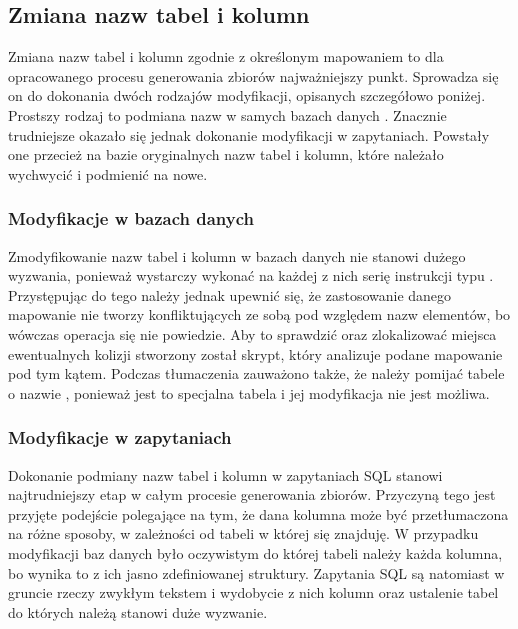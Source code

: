 \subsection{Zmiana nazw tabel i kolumn}
Zmiana nazw tabel i kolumn zgodnie z określonym mapowaniem to dla opracowanego procesu generowania zbiorów najważniejszy punkt. Sprowadza się on do dokonania dwóch rodzajów modyfikacji, opisanych szczegółowo poniżej. Prostszy rodzaj to podmiana nazw w samych bazach danych . Znacznie trudniejsze okazało się jednak dokonanie modyfikacji w zapytaniach. Powstały one przecież na bazie oryginalnych nazw tabel i kolumn, które należało wychwycić i podmienić na nowe.



\subsubsection{Modyfikacje w bazach danych}
Zmodyfikowanie nazw tabel i kolumn w bazach danych nie stanowi dużego wyzwania, ponieważ wystarczy wykonać na każdej z nich serię instrukcji typu . Przystępując do tego należy jednak upewnić się, że zastosowanie danego mapowanie nie tworzy konfliktujących ze sobą pod względem nazw elementów, bo wówczas operacja się nie powiedzie. Aby to sprawdzić oraz zlokalizować miejsca ewentualnych kolizji stworzony został skrypt, który analizuje podane mapowanie pod tym kątem. Podczas tłumaczenia zauważono także, że należy pomijać tabele o nazwie , ponieważ jest to specjalna tabela i jej modyfikacja nie jest możliwa.

\subsubsection{Modyfikacje w zapytaniach}
Dokonanie podmiany nazw tabel i kolumn w zapytaniach SQL stanowi najtrudniejszy etap w całym procesie generowania zbiorów. Przyczyną tego jest przyjęte podejście polegające na tym, że dana kolumna może być przetłumaczona na różne sposoby, w zależności od tabeli w której się znajduję. W przypadku modyfikacji baz danych było oczywistym do której tabeli należy każda kolumna, bo wynika to z ich jasno zdefiniowanej struktury. Zapytania SQL są natomiast w gruncie rzeczy zwykłym tekstem i wydobycie z nich kolumn oraz ustalenie tabel do których należą stanowi duże wyzwanie.

